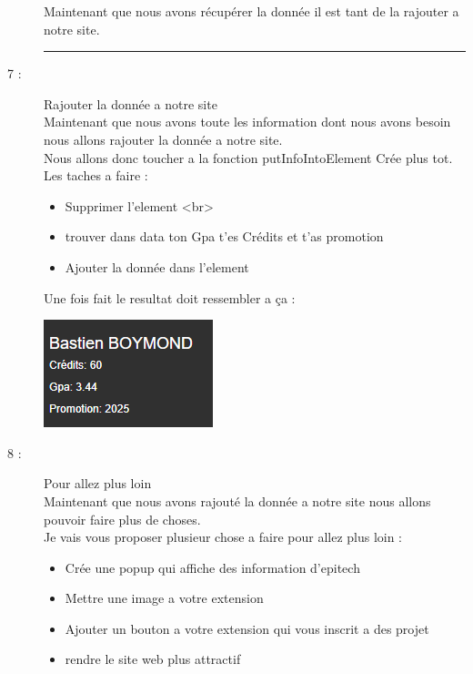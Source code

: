 \documentclass{article}
\begin{document}
\begin{description}
        Maintenant que nous avons récupérer la donnée il est tant de la rajouter a notre site.
        \begin{center}
            \rule{0.75\linewidth}{1pt}
        \end{center}
        \item[7 :]{Rajouter la donnée a notre site} \\ Maintenant que nous avons toute les information dont nous avons besoin nous allons rajouter la donnée a notre site.
        \\ Nous allons donc toucher a la fonction putInfoIntoElement Crée plus tot.
        \\ Les taches a faire :
        \begin{itemize}
            \item Supprimer l'element <br>
            \item trouver dans data ton Gpa t'es Crédits et t'as promotion
            \item Ajouter la donnée dans l'element
        \end{itemize}
        Une fois fait le resultat doit ressembler a ça :
        \begin{center}
            \includegraphics[scale=0.8]{final.PNG}
        \end{center}
        \item[8 :]{Pour allez plus loin} \\ Maintenant que nous avons rajouté la donnée a notre site nous allons pouvoir faire plus de choses.
        \\ Je vais vous proposer plusieur chose a faire pour allez plus loin :
        \begin{itemize}
            \item Crée une popup qui affiche des information d'epitech
            \item Mettre une image a votre extension
            \item Ajouter un bouton a votre extension qui vous inscrit a des projet
            \item rendre le site web plus attractif
        \end{itemize}
    \end{description}
\end{document}
